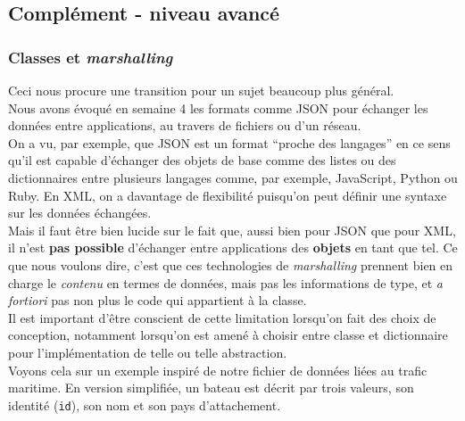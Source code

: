     \hypertarget{compluxe9ment---niveau-avancuxe9}{%
\subsection{Complément - niveau
avancé}\label{compluxe9ment---niveau-avancuxe9}}

    \hypertarget{classes-et-marshalling}{%
\subsubsection{\texorpdfstring{Classes et
\emph{marshalling}}{Classes et marshalling}}\label{classes-et-marshalling}}

    Ceci nous procure une transition pour un sujet beaucoup plus général.\\

Nous avons évoqué en semaine 4 les formats comme JSON pour échanger les
données entre applications, au travers de fichiers ou d'un réseau.\\

On a vu, par exemple, que JSON est un format ``proche des langages'' en
ce sens qu'il est capable d'échanger des objets de base comme des listes
ou des dictionnaires entre plusieurs langages comme, par exemple,
JavaScript, Python ou Ruby. En XML, on a davantage de flexibilité
puisqu'on peut définir une syntaxe sur les données échangées.\\

Mais il faut être bien lucide sur le fait que, aussi bien pour JSON que
pour XML, il n'est \textbf{pas possible} d'échanger entre applications
des \textbf{objets} en tant que tel. Ce que nous voulons dire, c'est que
ces technologies de \emph{marshalling} prennent bien en charge le
\emph{contenu} en termes de données, mais pas les informations de type,
et \emph{a fortiori} pas non plus le code qui appartient à la classe.\\

Il est important d'être conscient de cette limitation lorsqu'on fait des
choix de conception, notamment lorsqu'on est amené à choisir entre
classe et dictionnaire pour l'implémentation de telle ou telle
abstraction.\\

    Voyons cela sur un exemple inspiré de notre fichier de données liées au
trafic maritime. En version simplifiée, un bateau est décrit par trois
valeurs, son identité (\texttt{id}), son nom et son pays d'attachement.\\

